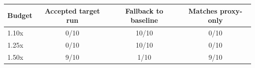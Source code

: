 \begin{tabular}{lccc}
  \toprule
  Budget & Accepted target run & Fallback to baseline & Matches proxy-only \\
  \midrule
  1.10x & 0/10 & 10/10 & 0/10 \\
  1.25x & 0/10 & 10/10 & 0/10 \\
  1.50x & 9/10 & 1/10 & 9/10 \\
  \bottomrule
\end{tabular}
